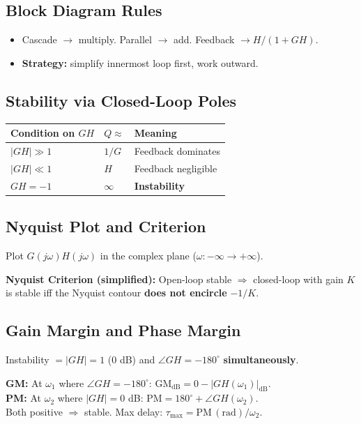 \documentclass[11pt]{article}
\begin{document}
\subsection{Block Diagram Rules}
\begin{itemize}
  \item Cascade $\to$ multiply. Parallel $\to$ add. Feedback $\to H/(1+GH)$.
  \item \textbf{Strategy:} simplify innermost loop first, work outward.
\end{itemize}

\subsection{Stability via Closed-Loop Poles}
\begin{center}
\begin{tabular}{lll}
\toprule
Condition on $GH$ & $Q \approx$ & Meaning \\
\midrule
$|GH| \gg 1$ & $1/G$ & Feedback dominates \\
$|GH| \ll 1$ & $H$ & Feedback negligible \\
$GH = -1$ & $\infty$ & \textbf{Instability} \\
\bottomrule
\end{tabular}
\end{center}

\subsection{Nyquist Plot and Criterion}
Plot $G(j\omega)H(j\omega)$ in the complex plane ($\omega : -\infty \to +\infty$).

\noindent\textbf{Nyquist Criterion (simplified):} Open-loop stable $\Rightarrow$ closed-loop with gain $K$ is stable iff the Nyquist contour \textbf{does not encircle} $-1/K$.

\subsection{Gain Margin and Phase Margin}
Instability $= |GH| = 1$ (0 dB) and $\angle GH = -180^\circ$ \textbf{simultaneously}.

\textbf{GM:} At $\omega_1$ where $\angle GH = -180^\circ$: $\mathrm{GM}_\text{dB} = 0 - |GH(\omega_1)|_\text{dB}$. \\
\textbf{PM:} At $\omega_2$ where $|GH| = 0$ dB: $\mathrm{PM} = 180^\circ + \angle GH(\omega_2)$. \\
Both positive $\Rightarrow$ stable. Max delay: $\tau_\text{max} = \mathrm{PM\,(rad)} / \omega_2$.
\end{document}
